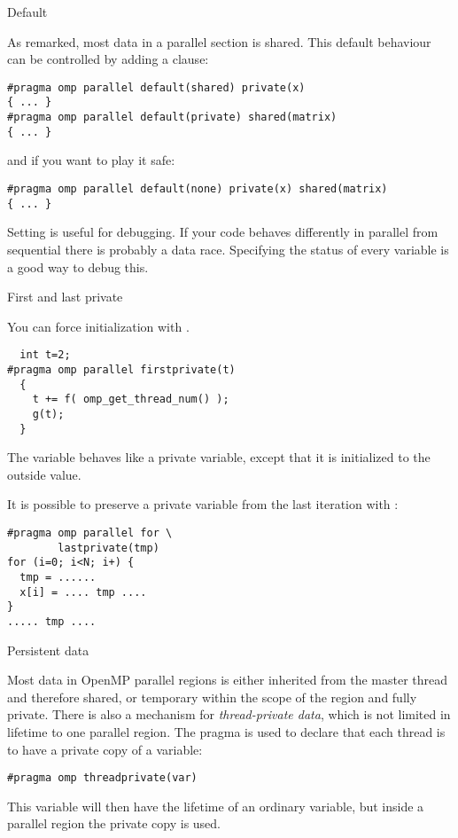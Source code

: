  {Default}

As remarked, most data in a parallel section is shared. This default behaviour can be 
controlled by adding a  clause:
\begin{verbatim}
#pragma omp parallel default(shared) private(x)
{ ... }
#pragma omp parallel default(private) shared(matrix)
{ ... }
\end{verbatim}
and if you want to play it safe:
\begin{verbatim}
#pragma omp parallel default(none) private(x) shared(matrix)
{ ... }
\end{verbatim}

Setting  is useful for debugging. If your code
behaves differently in parallel from sequential there is probably a data race.
Specifying the status of every variable is a good way to
debug this.

 {First and last private}

You can force initialization with .
\begin{verbatim}
  int t=2;
#pragma omp parallel firstprivate(t)
  {
    t += f( omp_get_thread_num() );
    g(t);
  }
\end{verbatim}
The variable  behaves like a private variable, except that it is
initialized to the outside value.

It is possible to preserve a private variable
from the last iteration with :
\begin{verbatim}
#pragma omp parallel for \
        lastprivate(tmp)
for (i=0; i<N; i+) {
  tmp = ......
  x[i] = .... tmp ....
}
..... tmp ....
\end{verbatim}

 {Persistent data}

Most data in OpenMP parallel regions is either inherited
from the master thread and therefore shared, or temporary within the scope of the
region and fully private.
There is also a mechanism for \emph{thread-private
  data},
which is not limited in lifetime to one parallel region.
The  pragma is used to declare that each thread
is to have a private copy of a variable:
\begin{verbatim}
#pragma omp threadprivate(var)
\end{verbatim}
This variable will then have the lifetime of an ordinary variable,
but inside a parallel region the private copy is used.

